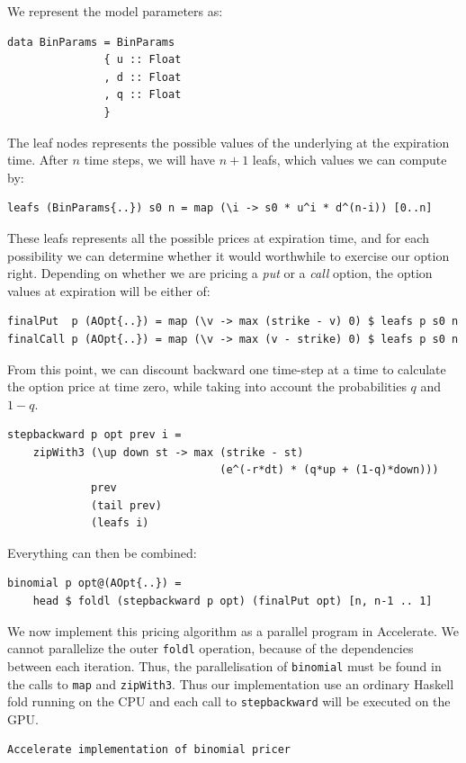 \documentclass[preprint]{sigplanconf}
\begin{document}
We represent the model parameters as:
\begin{verbatim}
data BinParams = BinParams 
               { u :: Float
               , d :: Float
               , q :: Float
               }
\end{verbatim}

The leaf nodes represents the possible values of the underlying at
the expiration time. After $n$ time steps, we will have $n+1$ leafs, which
values we can compute by:
\begin{verbatim}
leafs (BinParams{..}) s0 n = map (\i -> s0 * u^i * d^(n-i)) [0..n]
\end{verbatim}
These leafs represents all the possible prices at expiration time, and
for each possibility we can determine whether it would worthwhile to
exercise our option right. Depending on whether we are pricing a
\emph{put} or a \emph{call} option, the option values at expiration
will be either of:
\begin{verbatim}
finalPut  p (AOpt{..}) = map (\v -> max (strike - v) 0) $ leafs p s0 n
finalCall p (AOpt{..}) = map (\v -> max (v - strike) 0) $ leafs p s0 n
\end{verbatim}
From this point, we can discount backward one time-step at a time to
calculate the option price at time zero, while taking into account the
probabilities $q$ and $1-q$.
\begin{verbatim}
stepbackward p opt prev i =
    zipWith3 (\up down st -> max (strike - st) 
                                 (e^(-r*dt) * (q*up + (1-q)*down)))
             prev
             (tail prev)
             (leafs i)
\end{verbatim}
Everything can then be combined:
\begin{verbatim}
binomial p opt@(AOpt{..}) =
    head $ foldl (stepbackward p opt) (finalPut opt) [n, n-1 .. 1]
\end{verbatim}

We now implement this pricing algorithm as a parallel program in
Accelerate. We cannot parallelize the outer \verb|foldl| operation,
because of the dependencies between each iteration. Thus, the
parallelisation of \verb|binomial| must be found in the calls to
\verb|map| and \verb|zipWith3|. Thus our implementation use an
ordinary Haskell fold running on the CPU and each call to
\verb|stepbackward| will be executed on the GPU.
\begin{verbatim}
Accelerate implementation of binomial pricer
\end{verbatim}
\end{document}
